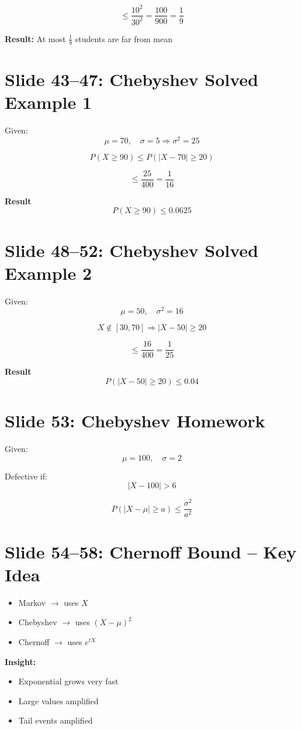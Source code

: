\documentclass[12pt]{article}
\begin{document}
\[
\le \frac{10^2}{30^2}
= \frac{100}{900}
= \frac{1}{9}
\]

\textbf{Result:}  
At most \( \frac{1}{9} \) students are far from mean  

\section*{Slide 43–47: Chebyshev Solved Example 1}
Given:
\[
\mu = 70, \quad \sigma = 5 \Rightarrow \sigma^2 = 25
\]

\[
P(X \ge 90) \le P(|X - 70| \ge 20)
\]

\[
\le \frac{25}{400}
= \frac{1}{16}
\]

\textbf{Result}
\[
P(X \ge 90) \le 0.0625
\]

\section*{Slide 48–52: Chebyshev Solved Example 2}
Given:
\[
\mu = 50, \quad \sigma^2 = 16
\]

\[
X \notin [30, 70] \Rightarrow |X - 50| \ge 20
\]

\[
\le \frac{16}{400}
= \frac{1}{25}
\]

\textbf{Result}
\[
P(|X - 50| \ge 20) \le 0.04
\]

\section*{Slide 53: Chebyshev Homework}
Given:
\[
\mu = 100, \quad \sigma = 2
\]

Defective if:
\[
|X - 100| > 6
\]

\[
P(|X - \mu| \ge a) \le \frac{\sigma^2}{a^2}
\]

\section*{Slide 54–58: Chernoff Bound – Key Idea}
\begin{itemize}
\item Markov $\rightarrow$ uses \( X \)  
\item Chebyshev $\rightarrow$ uses \( (X - \mu)^2 \)  
\item Chernoff $\rightarrow$ uses \( e^{tX} \)  
\end{itemize}

\textbf{Insight:}
\begin{itemize}
\item Exponential grows very fast  
\item Large values amplified  
\item Tail events amplified  
\end{itemize}
\end{document}
